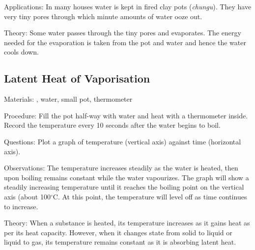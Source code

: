 \begin{multicols}{2}
\begin{description*}
\item[Applications:]{In many houses water is kept in fired clay pots (\emph{chungu}). They have very tiny pores through which minute amounts of water ooze out.}
\item[Theory:]{Some water passes through the tiny pores and evaporates. The energy needed for the evaporation is taken from the pot and water and hence the water cools down.}
\end{description*}

\subsection{Latent Heat of Vaporisation}


\begin{description*}
\item[Materials:]{, water, small pot, thermometer}
\item[Procedure:]{Fill the pot half-way with water and heat with a thermometer inside. Record the temperature every 10 seconds after the water begins to boil.}
\item[Questions:]{Plot a graph of temperature (vertical axis) against time (horizontal axis).}
\item[Observations:]{The temperature increases steadily as the water is heated, then upon boiling remains constant while the water vapourizes. The graph will show a steadily increasing temperature until it reaches the boiling point on the vertical axis (about 100$^\circ$C. At this point, the temperature will level off as time continues to increase.}
\item[Theory:]{When a substance is heated, its temperature increases as it gains heat as per its heat capacity. However, when it changes state from solid to liquid or liquid to gas, its temperature remains constant as it is absorbing latent heat.}
\end{description*}


\end{multicols}
